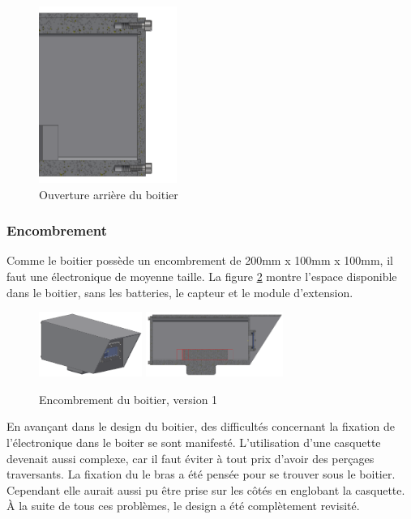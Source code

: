 \begin{figure}[H]
    \centering
    \includegraphics[width=0.4\textwidth]{Images/photos_PGA/Arrièreboitierv3coté.PNG}
    \caption{Ouverture arrière du boitier}
    \label{fig:vuearriereboitier}
\end{figure}

\subsubsection{Encombrement}

Comme le boitier possède un encombrement de 200mm x 100mm x 100mm, il faut une électronique de 
moyenne taille. La figure \ref{fig:encombrementv1} montre l'espace disponible dans le boitier, sans 
les batteries, le capteur et le module d'extension.

\begin{figure}[H]
    \centering
    \includegraphics[width=0.3\textwidth]{Images/photos_PGA/boitierV3.PNG}
    \includegraphics[width=0.4\textwidth]{Images/photos_PGA/boitierV3enc.PNG}
    \caption{Encombrement du boitier, version 1}
    \label{fig:encombrementv1}
\end{figure}

En avançant dans le design du boitier, des difficultés concernant la fixation de l’électronique dans le boiter 
se sont manifesté. L’utilisation d’une casquette devenait aussi complexe, car il faut éviter à tout prix d'avoir
des perçages traversants. La fixation du le bras a été pensée pour se trouver
sous le boitier. Cependant elle aurait aussi pu être prise sur les côtés en englobant la casquette. 
À la suite de tous ces problèmes, le design a été complètement revisité.


